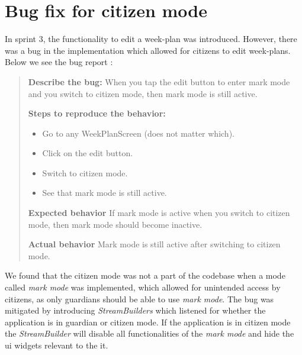 \section{Bug fix for citizen mode}
In sprint 3, the functionality to edit a week-plan was introduced. However, there was a bug in the implementation which allowed for \glspl{citizen} to edit week-plans. Below we see the bug report :

\begin{quote}
  \textbf{Describe the bug:} When you tap the edit button to enter mark mode and you switch to citizen mode, then mark mode is still active.

  \textbf{Steps to reproduce the behavior:}
  \begin{itemize}
    \item Go to any WeekPlanScreen (does not matter which).
    \item Click on the edit button.
    \item Switch to citizen mode.
    \item See that mark mode is still active.
  \end{itemize}

  \textbf{Expected behavior}
  If mark mode is active when you switch to citizen mode, then mark mode should become inactive.

  \textbf{Actual behavior}
  Mark mode is still active after switching to citizen mode.
\end{quote}

We found that the \gls{citizen} mode was not a part of the codebase when a mode called \textit{mark mode} was implemented, which allowed for unintended access by \glspl{citizen}, as only \glspl{guardian} should be able to use \textit{mark mode}. The bug was mitigated by introducing \textit{StreamBuilders} which listened for whether the application is in \gls{guardian} or \gls{citizen} mode. If the application is in \gls{citizen} mode the \textit{StreamBuilder} will disable all functionalities of the \textit{mark mode} and hide the \gls{ui} widgets relevant to the it.
